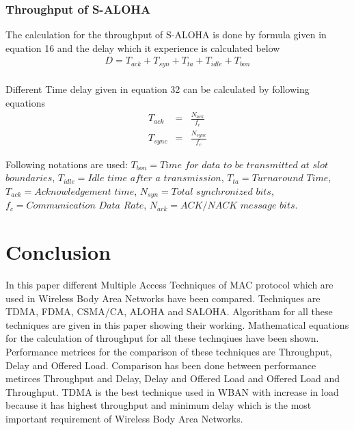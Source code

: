 \documentclass[10pt, conference, compsocconf]{IEEEtran}
\begin{document}
\subsubsection{Throughput of S-ALOHA}
The calculation for the throughput of S-ALOHA is done by formula given in equation 16 and the delay which it experience is calculated below
\begin{eqnarray}
D=T_{ack}+T_{syn}+T_{ta}+T_{idle}+ T_{bon}
\end{eqnarray}
\\
Different Time delay given in equation 32 can be calculated by following equations
\begin{eqnarray}
T_{ack}&=&\frac{N_{ack}}{f_{c}}
\\
T_{sync}&=&\frac{N_{sync}}{f_{c}}
\end{eqnarray}

Following notations are used: $T_{bon}=Time$ $for$ $data$ $to$ $be$ $transmitted$ $at$ $slot$ $boundaries$, $T_{idle}=Idle$ $time$ $after$ $a$ $transmission$, $T_{ta}=Turnaround$ $Time$, $T_{ack}=Acknowledgement$ $time$, $N_{syn}=Total$ $synchronized$ $bits$, $f_{c}= Communication$ $Data$ $Rate$, $N_{ack}=ACK/NACK$ $message$ $bits$.
\section{Conclusion}
In this paper different Multiple Access Techniques of MAC protocol which are used in Wireless Body Area Networks have been compared. Techniques are
TDMA, FDMA, CSMA/CA, ALOHA and SALOHA. Algoritham for all these techniques are given in this paper showing their working. Mathematical equations for the calculation of throughput for all these technqiues have been shown. Performance metrices for the comparison of these techniques are Throughput, Delay and Offered Load. Comparison has been done between performance metirces Throughput and Delay, Delay and Offered Load and Offered Load and Throughput. TDMA is the best technique used in WBAN with increase in load because it has highest throughput and minimum delay which is the most important requirement of Wireless Body Area Networks.
\end{document}
